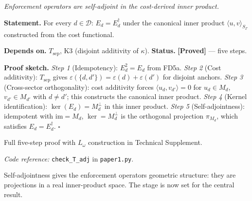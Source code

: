 \documentclass[11pt]{article}
\theoremstyle{remark}
\newcommand{\coderef}[2]{\smallskip\noindent\textit{Code reference:} \texttt{#1} in \texttt{#2}.}
\begin{document}
\begin{tcolorbox}[apfbox, title={Theorem $T_{\mathrm{adj}}$ (Self-Adjointness from Cost Symmetry)}]
\label{def:enforcement_algebra}\label{eq:canon_ip}
\textit{Enforcement operators are self-adjoint in the cost-derived inner product.}

\smallskip\noindent\textbf{Statement.}  For every $d \in \mathcal{D}$: $E_d = E_d^\dagger$ under the canonical inner product $\langle u, v \rangle_{S_\Gamma}$ constructed from the cost functional.

\smallskip\noindent\textbf{Depends on.}  $T_{\mathrm{sep}}$, K3 (disjoint additivity of $\kappa$).  \textbf{Status.}  \textbf{[Proved]} --- five steps.

\smallskip\noindent\textbf{Proof sketch.}  \textit{Step 1} (Idempotency): $E_d^2 = E_d$ from FD5a.  \textit{Step 2} (Cost additivity): $T_{\mathrm{sep}}$ gives $\varepsilon(\{d,d'\}) = \varepsilon(d) + \varepsilon(d')$ for disjoint anchors.  \textit{Step 3} (Cross-sector orthogonality): cost additivity forces $\langle u_d, v_{d'} \rangle = 0$ for $u_d \in M_d$, $v_{d'} \in M_{d'}$ with $d \ne d'$; this constructs the canonical inner product.  \textit{Step 4} (Kernel identification): $\ker(E_d) = M_d^\perp$ in this inner product.  \textit{Step 5} (Self-adjointness): idempotent with $\mathrm{im} = M_d$, $\ker = M_d^\perp$ is the orthogonal projection $\pi_{M_d}$, which satisfies $E_d = E_d^\dagger$.  \hfill$\square$

\smallskip\noindent Full five-step proof with $L_\omega$ construction in Technical Supplement.

\coderef{check\_T\_adj}{paper1.py}
\end{tcolorbox}

\smallskip\noindent Self-adjointness gives the enforcement operators geometric structure: they are projections in a real inner-product space.  The stage is now set for the central result.
\end{document}
